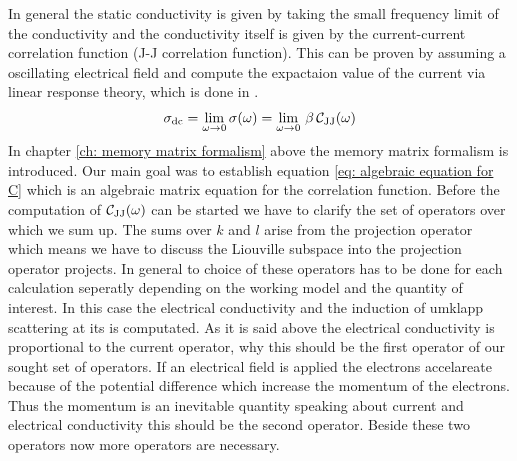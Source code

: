 In general the static conductivity is given by taking the small frequency limit of the conductivity and the conductivity itself is given by the current-current correlation function (J-J correlation function). This can be proven by assuming a oscillating electrical field and compute the expactaion value of the current via linear response theory, which is done in \cite{Chycholl2}.
%
\begin{align}
	\sigma_{\mathrm{dc}} = \lim\limits_{\omega \to 0} \sigma(\omega) = \lim\limits_{\omega \to 0}\, \beta\,\mathcal{C}_{\mathrm{JJ}}(\omega)
	\label{eq: general static condictivity}
\end{align}
%
In chapter \ref{ch: memory matrix formalism} above the memory matrix formalism is introduced. 
Our main goal was to establish equation \eqref{eq: algebraic equation for C} which is an algebraic matrix equation for the correlation function.
Before the computation of $\mathcal{C}_{\mathrm{JJ}}(\omega)$ can be started we have to clarify the set of operators over which we sum up.
The sums over $k$ and $l$ arise from the projection operator which means we have to discuss the Liouville subspace into the projection operator projects.
In general to choice of these operators has to be done for each calculation seperatly depending on the working model and the quantity of interest.
In this case the electrical conductivity and the induction of umklapp scattering at its is computated.
As it is said above the electrical conductivity is proportional to the current operator, why this should be the first operator of our sought set of operators.
If an electrical field is applied the electrons accelareate because of the potential difference which increase the momentum of the electrons.
Thus the momentum is an inevitable quantity speaking about current and electrical conductivity this should be the second operator.
Beside these two operators now more operators are necessary.

